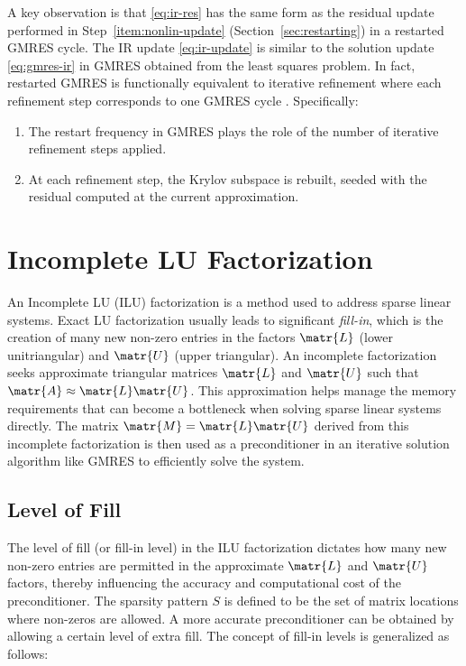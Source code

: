 A key observation is that \eqref{eq:ir-res} has the same form as the residual
update performed in Step~\ref{item:nonlin-update} (Section~\ref{sec:restarting})
in a restarted GMRES cycle. The IR update \eqref{eq:ir-update} is similar to the
solution update \eqref{eq:gmres-ir} in GMRES obtained from the least squares
problem. In fact, restarted GMRES is functionally equivalent to iterative
refinement where each refinement step corresponds to one GMRES cycle
\cite{lindquist_improving_2020,mary_mixed_2023}. Specifically:
\begin{enumerate}
\item The restart frequency in GMRES plays the role of the number of iterative
  refinement steps applied.
\item At each refinement step, the Krylov subspace is rebuilt, seeded with the
  residual computed at the current approximation.
\end{enumerate}

\section{Incomplete LU Factorization}
\label{sec:incompl-lu-fact}

An Incomplete LU (ILU) factorization is a method used to address sparse linear
systems. Exact LU factorization usually leads to significant \emph{fill-in},
which is the creation of many new non-zero entries in the factors \(\matr{L}\)
(lower unitriangular) and \(\matr{U}\) (upper triangular). An incomplete
factorization seeks approximate triangular matrices \(\matr{L}\) and
\(\matr{U}\) such that \(\matr{A} \approx \matr{L} \matr{U}\). This
approximation helps manage the memory requirements that can become a bottleneck
when solving sparse linear systems directly. The matrix \(\matr{M} = \matr{L}
\matr{U}\) derived from this incomplete factorization is then used as a
preconditioner in an iterative solution algorithm like GMRES to efficiently
solve the system.

\subsection{Level of Fill}
\label{sec:level-fill}

The level of fill (or fill-in level) in the ILU factorization dictates how many
new non-zero entries are permitted in the approximate \(\matr{L}\) and
\(\matr{U}\) factors, thereby influencing the accuracy and computational cost of
the preconditioner. The sparsity pattern \(S\) is defined to be the set of
matrix locations where non-zeros are allowed. A more accurate preconditioner can
be obtained by allowing a certain level of extra fill. The concept of fill-in
levels is generalized as follows:


